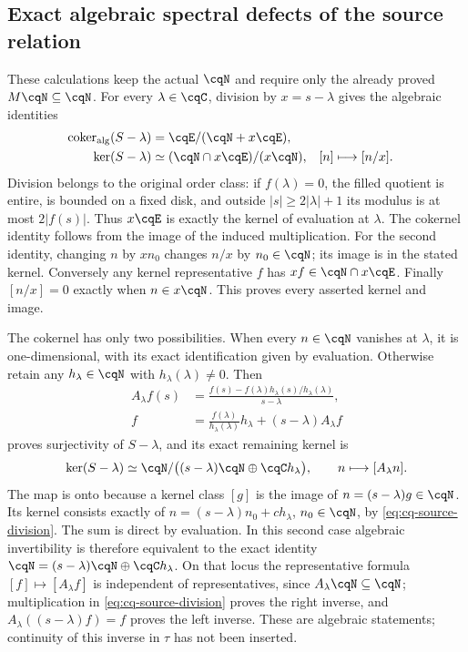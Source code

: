 \subsection{Exact algebraic spectral defects of the source relation}
\label{sec:cq-sourcealgebra}
These calculations keep the actual $\cqN$ and require only the
already proved $M\cqN\subseteq\cqN$. For every $\lambda\in\cqC$,
division by $x=s-\lambda$ gives the algebraic identities
\begin{equation}\label{eq:cq-source-kercoker}
 \begin{aligned}
 \operatorname{coker}_{\rm alg}(S-\lambda)
     &=\cqE/(\cqN+x\cqE),\\
 \ker(S-\lambda)&\simeq
        (\cqN\cap x\cqE)/(x\cqN),
        & [n]&\longmapsto[n/x].
 \end{aligned}
\end{equation}
Division belongs to the original order class: if $f(\lambda)=0$,
the filled quotient is entire, is bounded on a fixed disk, and
outside $|s|\geq2|\lambda|+1$ its modulus is at most $2|f(s)|$.
Thus $x\cqE$ is exactly the kernel of evaluation at $\lambda$.
The cokernel identity follows from the image of the induced
multiplication. For the second identity, changing $n$ by $xn_0$
changes $n/x$ by $n_0\in\cqN$; its image is in the stated
kernel. Conversely any kernel representative $f$ has
$xf\in\cqN\cap x\cqE$. Finally $[n/x]=0$ exactly when
$n\in x\cqN$. This proves every asserted kernel and image.

The cokernel has only two possibilities. When every $n\in\cqN$
vanishes at $\lambda$, it is one-dimensional, with its exact
identification given by evaluation. Otherwise retain any
$h_\lambda\in\cqN$ with $h_\lambda(\lambda)\ne0$. Then
\begin{equation}\label{eq:cq-source-division}
 \begin{aligned}
 A_\lambda f(s)&=
  \frac{f(s)-f(\lambda)h_\lambda(s)/h_\lambda(\lambda)}{s-\lambda},\\
 f&=\frac{f(\lambda)}{h_\lambda(\lambda)}h_\lambda
                                      +(s-\lambda)A_\lambda f
 \end{aligned}
\end{equation}
proves surjectivity of $S-\lambda$, and its exact remaining kernel is
\begin{equation}\label{eq:cq-source-splitting}
 \ker(S-\lambda)\simeq
 \cqN/\bigl((s-\lambda)\cqN\oplus\cqC h_\lambda\bigr),
 \qquad n\longmapsto[A_\lambda n].
\end{equation}
The map is onto because a kernel class $[g]$ is the image of
$n=(s-\lambda)g\in\cqN$. Its kernel consists exactly of
$n=(s-\lambda)n_0+c h_\lambda$, $n_0\in\cqN$, by
\eqref{eq:cq-source-division}. The sum is direct by evaluation.
In this second case algebraic invertibility is therefore equivalent
to the exact identity
$\cqN=(s-\lambda)\cqN\oplus\cqC h_\lambda$.
On that locus the representative formula $[f]\mapsto[A_\lambda f]$
is independent of representatives, since $A_\lambda\cqN\subseteq
\cqN$; multiplication in \eqref{eq:cq-source-division} proves the
right inverse, and $A_\lambda((s-\lambda)f)=f$ proves the left
inverse. These are algebraic statements; continuity of this inverse
in $\tau$ has not been inserted.

